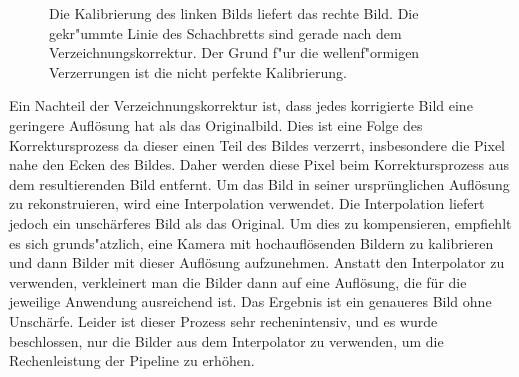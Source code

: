 \documentclass[arbeit=studie,oneside,BCOR=12mm]{ArbeitRST}
\begin{document}
\begin{figure}[h]
    \centering
    \caption{Die Kalibrierung des linken Bilds liefert das rechte Bild. Die gekr"ummte Linie 
    des Schachbretts sind gerade nach dem Verzeichnungskorrektur. Der Grund f"ur die
    wellenf"ormigen Verzerrungen ist die nicht perfekte Kalibrierung.} 
    \label{checkerboards}
\end{figure}

Ein Nachteil der Verzeichnungskorrektur ist, dass jedes korrigierte Bild eine
geringere Auflösung hat als das Originalbild. Dies ist eine Folge des
Korrektursprozess  da dieser einen Teil des Bildes verzerrt,
insbesondere die Pixel nahe den Ecken des Bildes. Daher werden diese Pixel beim
Korrektursprozess aus dem resultierenden Bild entfernt. Um das Bild in
seiner ursprünglichen Auflösung zu rekonstruieren, wird eine Interpolation
verwendet. Die Interpolation liefert jedoch ein unschärferes Bild als das
Original. Um dies zu kompensieren, empfiehlt es sich grunds"atzlich, eine Kamera mit
hochauflösenden Bildern zu kalibrieren und dann Bilder mit dieser Auflösung
aufzunehmen. Anstatt den Interpolator zu verwenden, verkleinert man die Bilder
dann auf eine Auflösung, die für die jeweilige Anwendung ausreichend ist.  Das
Ergebnis ist ein genaueres Bild ohne Unschärfe. Leider ist dieser Prozess sehr
rechenintensiv, und es wurde beschlossen, nur die Bilder aus dem Interpolator
zu verwenden, um die Rechenleistung der Pipeline zu erhöhen.
\end{document}
